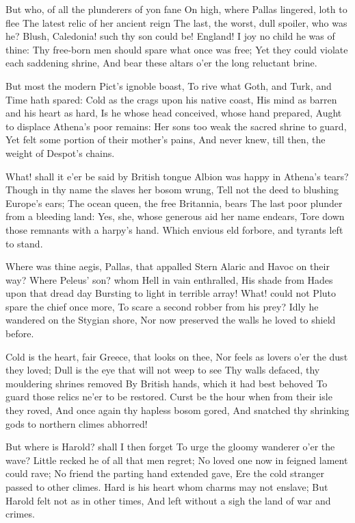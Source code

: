 \documentclass[10pt,twocolumn]{book}
\begin{document}
   But who, of all the plunderers of yon fane
   On high, where Pallas lingered, loth to flee
   The latest relic of her ancient reign\textemdash
   The last, the worst, dull spoiler, who was he?
   Blush, Caledonia! such thy son could be!
   England!  I joy no child he was of thine:
   Thy free-born men should spare what once was free;
   Yet they could violate each saddening shrine,
And bear these altars o'er the long reluctant brine.


   But most the modern Pict's ignoble boast,
   To rive what Goth, and Turk, and Time hath spared:
   Cold as the crags upon his native coast,
   His mind as barren and his heart as hard,
   Is he whose head conceived, whose hand prepared,
   Aught to displace Athena's poor remains:
   Her sons too weak the sacred shrine to guard,
   Yet felt some portion of their mother's pains,
And never knew, till then, the weight of Despot's chains.


   What! shall it e'er be said by British tongue
   Albion was happy in Athena's tears?
   Though in thy name the slaves her bosom wrung,
   Tell not the deed to blushing Europe's ears;
   The ocean queen, the free Britannia, bears
   The last poor plunder from a bleeding land:
   Yes, she, whose generous aid her name endears,
   Tore down those remnants with a harpy's hand.
Which envious eld forbore, and tyrants left to stand.


   Where was thine aegis, Pallas, that appalled
   Stern Alaric and Havoc on their way?
   Where Peleus' son? whom Hell in vain enthralled,
   His shade from Hades upon that dread day
   Bursting to light in terrible array!
   What! could not Pluto spare the chief once more,
   To scare a second robber from his prey?
   Idly he wandered on the Stygian shore,
Nor now preserved the walls he loved to shield before.


   Cold is the heart, fair Greece, that looks on thee,
   Nor feels as lovers o'er the dust they loved;
   Dull is the eye that will not weep to see
   Thy walls defaced, thy mouldering shrines removed
   By British hands, which it had best behoved
   To guard those relics ne'er to be restored.
   Curst be the hour when from their isle they roved,
   And once again thy hapless bosom gored,
And snatched thy shrinking gods to northern climes abhorred!


   But where is Harold? shall I then forget
   To urge the gloomy wanderer o'er the wave?
   Little recked he of all that men regret;
   No loved one now in feigned lament could rave;
   No friend the parting hand extended gave,
   Ere the cold stranger passed to other climes.
   Hard is his heart whom charms may not enslave;
   But Harold felt not as in other times,
And left without a sigh the land of war and crimes.
\end{document}

